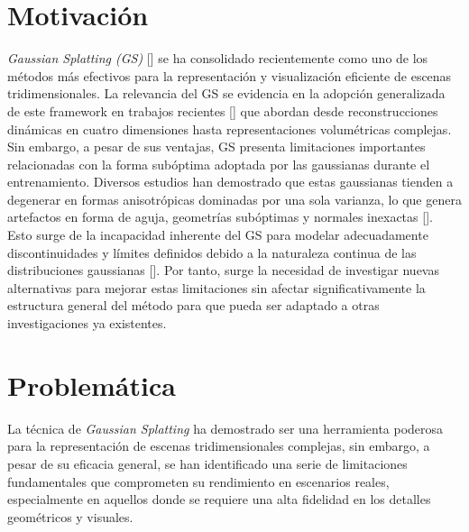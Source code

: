 \section{Motivación}
\textit{Gaussian Splatting (GS)} [\cite{kerbl20233d}] se ha consolidado recientemente como uno de los métodos más efectivos para la representación y 
visualización eficiente de escenas tridimensionales. La relevancia del GS se evidencia en la adopción generalizada 
de este framework en trabajos recientes [\cite{ chen2024survey}] que abordan desde reconstrucciones dinámicas en cuatro dimensiones hasta representaciones volumétricas complejas. 
Sin embargo, a pesar de sus ventajas, GS presenta limitaciones importantes relacionadas con la forma subóptima adoptada por las gaussianas durante el 
entrenamiento. Diversos estudios han demostrado que estas gaussianas tienden a degenerar en formas anisotrópicas dominadas por una sola varianza, 
lo que genera artefactos en forma de aguja, geometrías subóptimas y normales inexactas [\cite{hyung2024effectiverankanalysisregularization, huang2024spectralgstaming3dgaussian,yu2023mipsplattingaliasfree3dgaussian}]. 
Esto surge de la incapacidad inherente del GS para modelar adecuadamente discontinuidades y límites definidos 
debido a la naturaleza continua de las distribuciones gaussianas [\cite{qu2024discgsdiscontinuityawaregaussiansplatting}]. Por tanto, surge 
la necesidad de investigar nuevas alternativas para mejorar estas limitaciones sin afectar significativamente la estructura general del método
para que pueda ser adaptado a otras investigaciones ya existentes.

\section{Problemática}
La técnica de \textit{Gaussian Splatting} ha demostrado ser una herramienta poderosa para la representación de escenas tridimensionales complejas,
sin embargo, a pesar de su eficacia general, se han identificado una serie de limitaciones fundamentales que comprometen su rendimiento 
en escenarios reales, especialmente en aquellos donde se requiere una alta fidelidad en los detalles geométricos y visuales.

